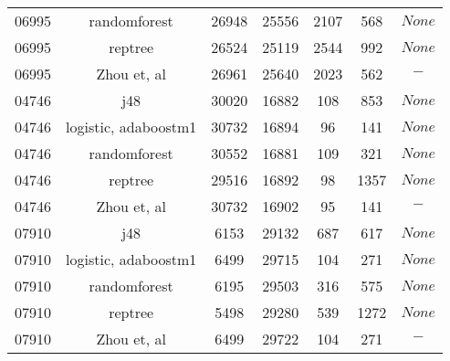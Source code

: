 \begin{table}[h]
\begin{center}
\begin{threeparttable}
\begin{tabular}{c c c c c c c}
    06995 & randomforest & 26948 & 25556 & 2107 & 568 & $None$ \\
    06995 & reptree & 26524 & 25119 & 2544 & 992 & $None$ \\
    06995 & Zhou et, al & 26961 & 25640 & 2023 & 562 & $-$ \\
    \hline
    04746 & j48 & 30020 & 16882 & 108 & 853 & $None$ \\
    04746 & logistic, adaboostm1 & 30732 & 16894 & 96 & 141 & $None$ \\
    04746 & randomforest & 30552 & 16881 & 109 & 321 & $None$ \\
    04746 & reptree & 29516 & 16892 & 98 & 1357 & $None$ \\
    04746 & Zhou et, al & 30732 & 16902 & 95 & 141 & $-$ \\
    \hline
    07910 & j48 & 6153 & 29132 & 687 & 617 & $None$ \\
    07910 & logistic, adaboostm1 & 6499 & 29715 & 104 & 271 & $None$ \\
    07910 & randomforest & 6195 & 29503 & 316 & 575 & $None$ \\
    07910 & reptree & 5498 & 29280 & 539 & 1272 & $None$ \\
    07910 & Zhou et, al & 6499 & 29722 & 104 & 271 & $-$ \\
  \bottomrule
\end{tabular}
\end{threeparttable}
\end{center}
\end{table}

